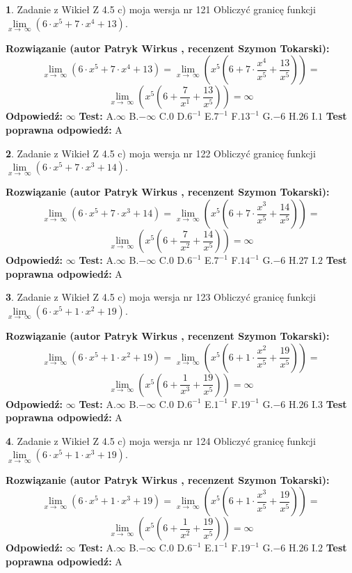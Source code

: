 \documentclass[12pt, a4paper]{article}
\theoremstyle{definition} %
\newtheorem{zad}{}
\newcommand{\zadStart}[1]{\begin{zad}#1\newline}
\newcommand{\zadStop}{\end{zad}}
\newcommand{\rozwStart}[2]{\noindent \textbf{Rozwiązanie (autor #1 , recenzent #2): }\newline}
\newcommand{\rozwStop}{\newline}
\newcommand{\odpStart}{\noindent \textbf{Odpowiedź:}\newline}
\newcommand{\odpStop}{\newline}
\newcommand{\testStart}{\noindent \textbf{Test:}\newline}
\newcommand{\testStop}{\newline}
\newcommand{\kluczStart}{\noindent \textbf{Test poprawna odpowiedź:}\newline}
\newcommand{\kluczStop}{\newline}
\begin{document}
\zadStart{Zadanie z Wikieł Z 4.5 c) moja wersja nr 121}
Obliczyć granicę funkcji  $\lim\limits_{x\to\ \infty}(6 \cdot x^{5}+7 \cdot x^{4}+13)$.
\zadStop
\rozwStart{Patryk Wirkus}{Szymon Tokarski}
$$\lim\limits_{x\to\ \infty}(6 \cdot x^{5}+7 \cdot x^{4}+13) = \lim\limits_{x\to\ \infty}(x^{5}(6 +7 \cdot \frac{x^{4}}{x^{5}}+\frac{13}{x^{5}})) =$$ $$\lim\limits_{x\to\ \infty}(x^{5}(6 +\frac{7}{x^{1}}+\frac{13}{x^{5}})) =\infty$$
\rozwStop
\odpStart
$\infty$
\odpStop
\testStart
A.$\infty$ B.$-\infty$ C.$0$ D.$6^{-1}$ E.$7^{-1}$
F.$13^{-1}$ G.$-6$
H.$26$
I.$1$
\testStop
\kluczStart
A
\kluczStop



\zadStart{Zadanie z Wikieł Z 4.5 c) moja wersja nr 122}
Obliczyć granicę funkcji  $\lim\limits_{x\to\ \infty}(6 \cdot x^{5}+7 \cdot x^{3}+14)$.
\zadStop
\rozwStart{Patryk Wirkus}{Szymon Tokarski}
$$\lim\limits_{x\to\ \infty}(6 \cdot x^{5}+7 \cdot x^{3}+14) = \lim\limits_{x\to\ \infty}(x^{5}(6 +7 \cdot \frac{x^{3}}{x^{5}}+\frac{14}{x^{5}})) =$$ $$\lim\limits_{x\to\ \infty}(x^{5}(6 +\frac{7}{x^{2}}+\frac{14}{x^{5}})) =\infty$$
\rozwStop
\odpStart
$\infty$
\odpStop
\testStart
A.$\infty$ B.$-\infty$ C.$0$ D.$6^{-1}$ E.$7^{-1}$
F.$14^{-1}$ G.$-6$
H.$27$
I.$2$
\testStop
\kluczStart
A
\kluczStop



\zadStart{Zadanie z Wikieł Z 4.5 c) moja wersja nr 123}
Obliczyć granicę funkcji  $\lim\limits_{x\to\ \infty}(6 \cdot x^{5}+1 \cdot x^{2}+19)$.
\zadStop
\rozwStart{Patryk Wirkus}{Szymon Tokarski}
$$\lim\limits_{x\to\ \infty}(6 \cdot x^{5}+1 \cdot x^{2}+19) = \lim\limits_{x\to\ \infty}(x^{5}(6 +1 \cdot \frac{x^{2}}{x^{5}}+\frac{19}{x^{5}})) =$$ $$\lim\limits_{x\to\ \infty}(x^{5}(6 +\frac{1}{x^{3}}+\frac{19}{x^{5}})) =\infty$$
\rozwStop
\odpStart
$\infty$
\odpStop
\testStart
A.$\infty$ B.$-\infty$ C.$0$ D.$6^{-1}$ E.$1^{-1}$
F.$19^{-1}$ G.$-6$
H.$26$
I.$3$
\testStop
\kluczStart
A
\kluczStop



\zadStart{Zadanie z Wikieł Z 4.5 c) moja wersja nr 124}
Obliczyć granicę funkcji  $\lim\limits_{x\to\ \infty}(6 \cdot x^{5}+1 \cdot x^{3}+19)$.
\zadStop
\rozwStart{Patryk Wirkus}{Szymon Tokarski}
$$\lim\limits_{x\to\ \infty}(6 \cdot x^{5}+1 \cdot x^{3}+19) = \lim\limits_{x\to\ \infty}(x^{5}(6 +1 \cdot \frac{x^{3}}{x^{5}}+\frac{19}{x^{5}})) =$$ $$\lim\limits_{x\to\ \infty}(x^{5}(6 +\frac{1}{x^{2}}+\frac{19}{x^{5}})) =\infty$$
\rozwStop
\odpStart
$\infty$
\odpStop
\testStart
A.$\infty$ B.$-\infty$ C.$0$ D.$6^{-1}$ E.$1^{-1}$
F.$19^{-1}$ G.$-6$
H.$26$
I.$2$
\testStop
\kluczStart
A
\kluczStop
\end{document}
